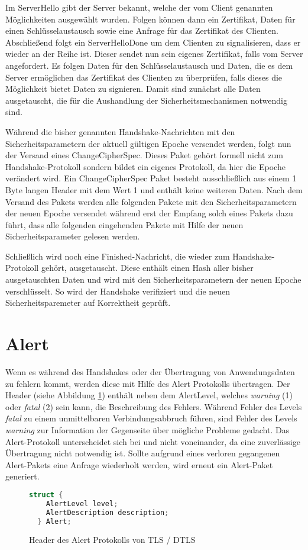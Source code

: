 Im ServerHello gibt der Server bekannt, welche der vom Client genannten Möglichkeiten ausgewählt wurden. Folgen können dann ein Zertifikat, Daten für einen Schlüsselaustausch
sowie eine Anfrage für das Zertifikat des Clienten. Abschließend folgt ein ServerHelloDone um dem Clienten zu signalisieren, dass er wieder an der Reihe ist. Dieser sendet
nun sein eigenes Zertifikat, falls vom Server angefordert. Es folgen Daten für den Schlüsselaustausch und Daten, die es dem Server ermöglichen das Zertifikat des Clienten
zu überprüfen, falls dieses die Möglichkeit bietet Daten zu signieren. Damit sind zunächst alle Daten ausgetauscht, die für die Aushandlung der Sicherheitsmechanismen
notwendig sind.

Während die bisher genannten Handshake-Nachrichten mit den Sicherheitsparametern der aktuell gültigen Epoche versendet werden, folgt nun der Versand eines
ChangeCipherSpec. Dieses Paket gehört formell nicht zum Handshake-Protokoll sondern bildet ein eigenes Protokoll, da hier die Epoche verändert wird.
Ein ChangeCipherSpec Paket besteht ausschließlich aus einem 1 Byte langen Header mit dem Wert 1 und enthält keine weiteren Daten.
Nach dem Versand des Pakets werden alle folgenden Pakete mit den Sicherheitsparametern der neuen Epoche versendet während erst der Empfang solch eines
Pakets dazu führt, dass alle folgenden eingehenden Pakete mit Hilfe der neuen Sicherheitsparameter gelesen werden.

Schließlich wird noch eine Finished-Nachricht, die wieder zum Handshake-Protokoll gehört, ausgetauscht. Diese enthält einen Hash aller bisher ausgetauschten Daten
und wird mit den Sicherheitsparametern der neuen Epoche verschlüsselt. So wird der Handshake verifiziert und die neuen Sicherheitsparemeter auf Korrektheit geprüft.

\section{Alert}

Wenn es während des Handshakes oder der Übertragung von Anwendungsdaten zu fehlern kommt, werden diese mit Hilfe des Alert Protokolls übertragen.
Der Header (siehe Abbildung \ref{fig:alertlayer}) enthält neben dem AlertLevel, welches \textit{warning} (1) oder \textit{fatal} (2) sein kann,
die Beschreibung des Fehlers. Während Fehler des Levels \textit{fatal} zu einem unmittelbaren Verbindungsabbruch führen, sind Fehler des Levels
\textit{warning} zur Information der Gegenseite über mögliche Probleme gedacht. Das Alert-Protokoll unterscheidet sich bei  und 
nicht voneinander, da eine zuverlässige Übertragung nicht notwendig ist. Sollte aufgrund eines verloren gegangenen Alert-Pakets eine Anfrage
wiederholt werden, wird erneut ein Alert-Paket generiert.

\begin{figure}[ht]
  \centering
  \begin{lstlisting}[language=c]
  struct {
    AlertLevel level;
    AlertDescription description;
  } Alert;
  \end{lstlisting}
  \caption{Header des Alert Protokolls von TLS / DTLS}
  \label{fig:alertlayer}
\end{figure}